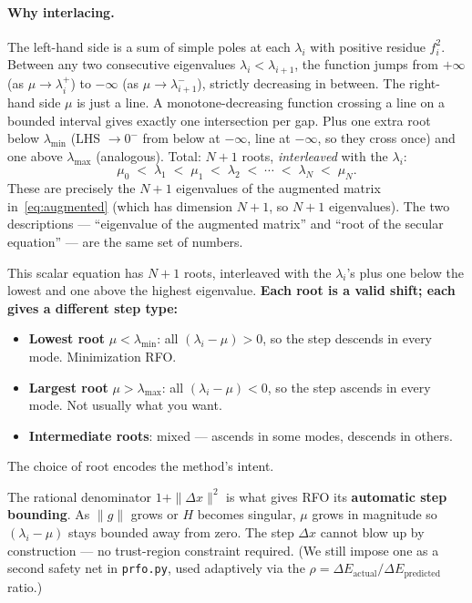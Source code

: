 \documentclass[11pt]{article}
\newcommand{\dx}{\Delta x}
\begin{document}
\paragraph{Why interlacing.}
The left-hand side is a sum of simple poles at each $\lambda_i$ with positive
residue $f_i^2$.  Between any two consecutive eigenvalues
$\lambda_i < \lambda_{i+1}$, the function jumps from $+\infty$ (as
$\mu \to \lambda_i^+$) to $-\infty$ (as $\mu \to \lambda_{i+1}^-$),
strictly decreasing in between.  The right-hand side $\mu$ is just a line.
A monotone-decreasing function crossing a line on a bounded interval gives
exactly one intersection per gap.  Plus one extra root below $\lambda_{\min}$
(LHS $\to 0^-$ from below at $-\infty$, line at $-\infty$, so they cross
once) and one above $\lambda_{\max}$ (analogous).  Total: $N+1$ roots,
\emph{interleaved} with the $\lambda_i$:
\begin{equation*}
  \mu_0 \;<\; \lambda_1 \;<\; \mu_1 \;<\; \lambda_2 \;<\; \cdots
  \;<\; \lambda_N \;<\; \mu_N.
\end{equation*}
These are precisely the $N+1$ eigenvalues of the augmented matrix
in~\eqref{eq:augmented} (which has dimension $N+1$, so $N+1$ eigenvalues).
The two descriptions --- ``eigenvalue of the augmented matrix'' and ``root of
the secular equation'' --- are the same set of numbers.

This scalar equation has $N+1$ roots, interleaved with the $\lambda_i$'s plus
one below the lowest and one above the highest eigenvalue.  \textbf{Each root
is a valid shift; each gives a different step type:}

\begin{itemize}
  \item \textbf{Lowest root} $\mu < \lambda_{\min}$: all $(\lambda_i - \mu) > 0$,
        so the step descends in every mode.  Minimization RFO.
  \item \textbf{Largest root} $\mu > \lambda_{\max}$: all $(\lambda_i - \mu) < 0$,
        so the step ascends in every mode.  Not usually what you want.
  \item \textbf{Intermediate roots}: mixed --- ascends in some modes, descends
        in others.
\end{itemize}

The choice of root encodes the method's intent.

The rational denominator $1 + \|\dx\|^2$ is what gives RFO its \textbf{automatic
step bounding}.  As $\|g\|$ grows or $H$ becomes singular, $\mu$ grows in
magnitude so $(\lambda_i - \mu)$ stays bounded away from zero.  The step $\dx$
cannot blow up by construction --- no trust-region constraint required.  (We
still impose one as a second safety net in \texttt{prfo.py}, used adaptively
via the $\rho = \Delta E_{\text{actual}} / \Delta E_{\text{predicted}}$ ratio.)
\end{document}
